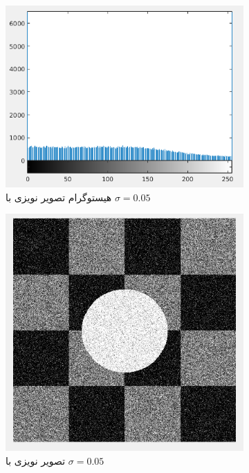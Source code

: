 \documentclass[11.5pt,a4paper]{article}
\begin{document}
\begin{figure}[h]
	\begin{subfigure}{.3\textwidth}
		\includegraphics[scale=0.2]{Imgs/NB_S05_Hist.png}
		\caption{هیستوگرام تصویر نویزی با $\sigma=0.05$}
	\end{subfigure}
	\begin{subfigure}{.3\textwidth}
		\includegraphics[scale=0.2]{Imgs/NB_S05_In.png}
		\caption{تصویر نویزی با $\sigma=0.05$}
	\end{subfigure}
	\begin{subfigure}{.3\textwidth}

\end{subfigure}
\end{figure}
\end{document}
